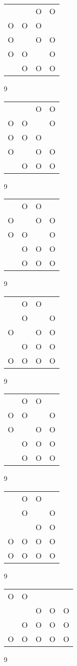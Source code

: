 \begin{tabular}{|m{0.2cm}m{0.2cm}m{0.2cm}m{0.2cm}|}\hline
 & &O&O\\
O&O&O& \\
O& &O&O\\
O&O& &O\\
 &O&O&O\\
\hline\end{tabular}9
\begin{tabular}{|m{0.2cm}m{0.2cm}m{0.2cm}m{0.2cm}|}\hline
 & &O&O\\
O&O& &O\\
O&O&O& \\
O& &O&O\\
 &O&O&O\\
\hline\end{tabular}9
\begin{tabular}{|m{0.2cm}m{0.2cm}m{0.2cm}m{0.2cm}|}\hline
 &O&O& \\
O& &O&O\\
O&O& &O\\
 &O&O&O\\
 &O&O&O\\
\hline\end{tabular}9
\begin{tabular}{|m{0.2cm}m{0.2cm}m{0.2cm}m{0.2cm}|}\hline
 &O&O& \\
 &O& &O\\
O& &O&O\\
 &O&O&O\\
O&O&O&O\\
\hline\end{tabular}9
\begin{tabular}{|m{0.2cm}m{0.2cm}m{0.2cm}m{0.2cm}|}\hline
 &O&O& \\
O&O& &O\\
O& &O&O\\
 &O&O&O\\
 &O&O&O\\
\hline\end{tabular}9
\begin{tabular}{|m{0.2cm}m{0.2cm}m{0.2cm}m{0.2cm}|}\hline
 &O&O& \\
 &O& &O\\
 & &O&O\\
O&O&O&O\\
O&O&O&O\\
\hline\end{tabular}9
\begin{tabular}{|m{0.2cm}m{0.2cm}m{0.2cm}m{0.2cm}m{0.2cm}|}\hline
O&O& & & \\
 & &O&O&O\\
 &O&O&O&O\\
O&O&O&O&O\\
\hline\end{tabular}9
